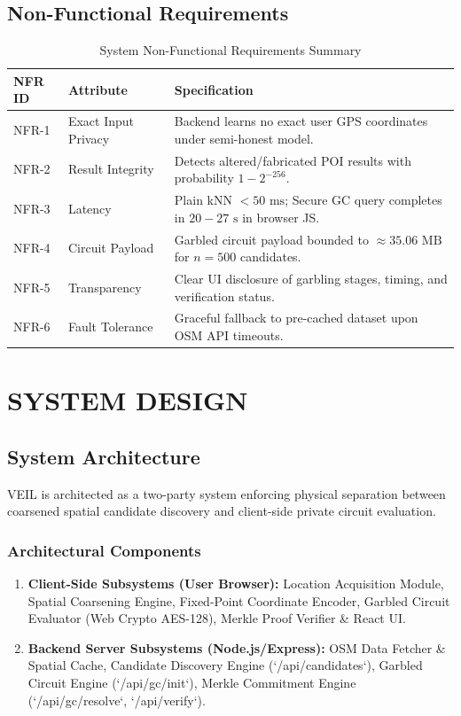 \documentclass[12pt,a4paper,oneside]{report}
\begin{document}
\section{Non-Functional Requirements}
\begin{table}[h!]
\centering
\caption{System Non-Functional Requirements Summary}
\small
\begin{tabular}{p{2cm}p{4cm}p{8cm}}
\toprule
\textbf{NFR ID} & \textbf{Attribute} & \textbf{Specification} \\
\midrule
NFR-1 & Exact Input Privacy & Backend learns no exact user GPS coordinates under semi-honest model. \\
NFR-2 & Result Integrity & Detects altered/fabricated POI results with probability $1 - 2^{-256}$. \\
NFR-3 & Latency & Plain kNN $< 50\text{ ms}$; Secure GC query completes in $20 - 27\text{ s}$ in browser JS. \\
NFR-4 & Circuit Payload & Garbled circuit payload bounded to $\approx 35.06\text{ MB}$ for $n=500$ candidates. \\
NFR-5 & Transparency & Clear UI disclosure of garbling stages, timing, and verification status. \\
NFR-6 & Fault Tolerance & Graceful fallback to pre-cached dataset upon OSM API timeouts. \\
\bottomrule
\end{tabular}
\end{table}


\chapter{SYSTEM DESIGN}

\section{System Architecture}
VEIL is architected as a two-party system enforcing physical separation between coarsened spatial candidate discovery and client-side private circuit evaluation.

\subsection{Architectural Components}
\begin{enumerate}
    \item \textbf{Client-Side Subsystems (User Browser):} Location Acquisition Module, Spatial Coarsening Engine, Fixed-Point Coordinate Encoder, Garbled Circuit Evaluator (Web Crypto AES-128), Merkle Proof Verifier \& React UI.
    \item \textbf{Backend Server Subsystems (Node.js/Express):} OSM Data Fetcher \& Spatial Cache, Candidate Discovery Engine (`/api/candidates`), Garbled Circuit Engine (`/api/gc/init`), Merkle Commitment Engine (`/api/gc/resolve`, `/api/verify`).
\end{enumerate}
\end{document}
